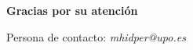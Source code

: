 \documentclass[10pt, aspectratio=169]{beamer}
\begin{document}
{
\begin{frame}[plain]
    \centering
    \vspace{2cm}
    {\huge \textbf{\textcolor{brandgreen}{Gracias por su atención}}}
    
    \vspace{1cm}
    
    \vspace{1cm}
    \footnotesize
    Persona de contacto: \textit{mhidper@upo.es}\\
\end{frame}
}
\end{document}
